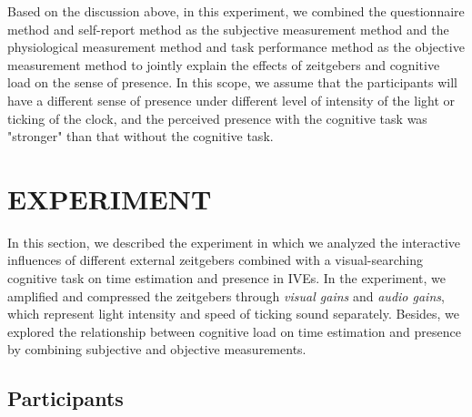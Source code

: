 \documentclass[sigconf]{acmart}
\begin{document}

Based on the discussion above, in this experiment, we combined the questionnaire method and self-report method as the subjective measurement method and the physiological measurement method and task performance method as the objective measurement method to jointly explain the effects of zeitgebers and cognitive load on the sense of presence. In this scope, we assume that the participants will have a different sense of presence under different level of intensity of the light or ticking of the clock, and the perceived presence with the cognitive task was "stronger" than that without the cognitive task.

\section{EXPERIMENT}


In this section, we described the experiment in which we analyzed the interactive influences of different external zeitgebers combined with a visual-searching cognitive task on time estimation and presence in IVEs. In the experiment, we amplified and compressed the zeitgebers through \emph{visual gains} and \emph{audio gains}, which represent light intensity and speed of ticking sound separately. Besides, we explored the relationship between cognitive load on time estimation and presence by combining subjective and objective measurements.

\subsection{Participants}

\end{document}
